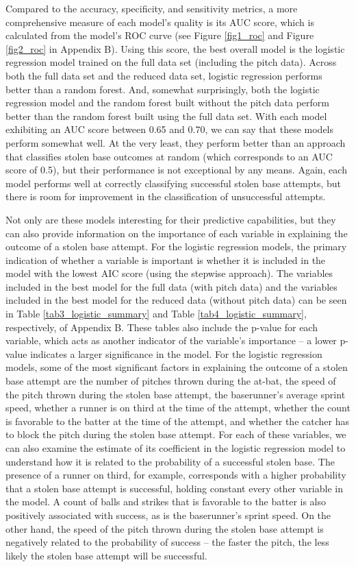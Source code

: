 \documentclass{article}
\begin{document}
Compared to the accuracy, specificity, and sensitivity metrics, a more comprehensive measure of each model’s quality is its AUC score, which is calculated from the model's ROC curve (see Figure \ref{fig1_roc} and Figure \ref{fig2_roc} in Appendix B). Using this score, the best overall model is the logistic regression model trained on the full data set (including the pitch data). Across both the full data set and the reduced data set, logistic regression performs better than a random forest. And, somewhat surprisingly, both the logistic regression model and the random forest built without the pitch data perform better than the random forest built using the full data set. With each model exhibiting an AUC score between 0.65 and 0.70, we can say that these models perform somewhat well. At the very least, they perform better than an approach that classifies stolen base outcomes at random (which corresponds to an AUC score of 0.5), but their performance is not exceptional by any means. Again, each model performs well at correctly classifying successful stolen base attempts, but there is room for improvement in the classification of unsuccessful attempts.

Not only are these models interesting for their predictive capabilities, but they can also provide information on the importance of each variable in explaining the outcome of a stolen base attempt. For the logistic regression models, the primary indication of whether a variable is important is whether it is included in the model with the lowest AIC score (using the stepwise approach). The variables included in the best model for the full data (with pitch data) and the variables included in the best model for the reduced data (without pitch data) can be seen in Table \ref{tab3_logistic_summary} and Table \ref{tab4_logistic_summary}, respectively, of Appendix B. These tables also include the p-value for each variable, which acts as another indicator of the variable's importance -- a lower p-value indicates a larger significance in the model. For the logistic regression models, some of the most significant factors in explaining the outcome of a stolen base attempt are the number of pitches thrown during the at-bat, the speed of the pitch thrown during the stolen base attempt, the baserunner's average sprint speed, whether a runner is on third at the time of the attempt, whether the count is favorable to the batter at the time of the attempt, and whether the catcher has to block the pitch during the stolen base attempt. For each of these variables, we can also examine the estimate of its coefficient in the logistic regression model to understand how it is related to the probability of a successful stolen base. The presence of a runner on third, for example, corresponds with a higher probability that a stolen base attempt is successful, holding constant every other variable in the model. A count of balls and strikes that is favorable to the batter is also positively associated with success, as is the baserunner's sprint speed. On the other hand, the speed of the pitch thrown during the stolen base attempt is negatively related to the probability of success -- the faster the pitch, the less likely the stolen base attempt will be successful.
\end{document}
